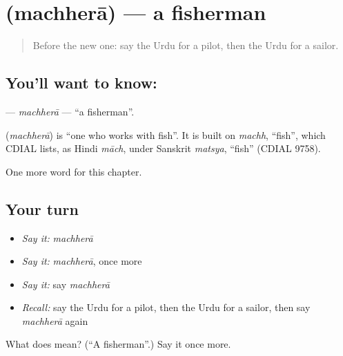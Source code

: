 \section[\texorpdfstring{\ur{مچھیرا} (machherā)}{مچھیرا (machherā)}]{ (machherā) — a fisherman}

\label{lesson:UR-C178-machhera}



\begin{quote}
Before the new one: say the Urdu for a pilot, then the Urdu for a sailor.
\end{quote}

\subsection*{You'll want to know: }
\textbf{} — \emph{machherā} — \textquotedblleft{}a fisherman\textquotedblright{}.

\begin{cousinweb}
\textbf{} (\emph{machherā}) is \textquotedblleft{}one who works with fish\textquotedblright{}. It is built on \emph{machh}, \textquotedblleft{}fish\textquotedblright{}, which CDIAL lists, as Hindi \emph{māch}, under Sanskrit \emph{matsya}, \textquotedblleft{}fish\textquotedblright{} (CDIAL 9758).
\end{cousinweb}

\begin{grammarlens}[title={What you've built}]
One more word for this chapter.
\end{grammarlens}

\subsection*{Your turn}
\begin{itemize}
\raggedright
  \item \emph{Say it:} \emph{machherā}
  \item \emph{Say it:} \emph{machherā}, once more
  \item \emph{Say it:} say \emph{machherā}
  \item \emph{Recall:} say the Urdu for a pilot, then the Urdu for a sailor, then say \emph{machherā} again
\end{itemize}

\begin{tcolorbox}[breakable,colback=teal!4,colframe=teal!35!black,title={Before you move on}]
What does  mean? (\textquotedblleft{}A fisherman\textquotedblright{}.) Say it once more.
\end{tcolorbox}
